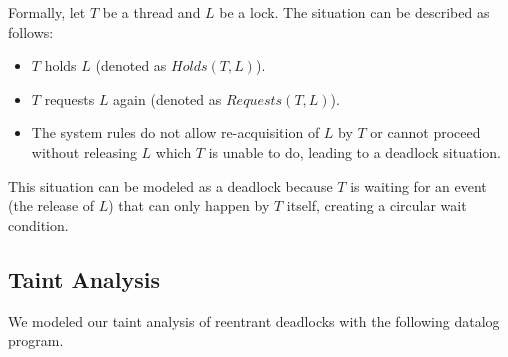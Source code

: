 \documentclass[conference]{IEEEtran}
\begin{document}
Formally, let $T$ be a thread and $L$ be a lock. The situation can be described as follows:

\begin{itemize}
    \item $T$ holds $L$ (denoted as $Holds(T, L)$).
    \item $T$ requests $L$ again (denoted as $Requests(T, L)$).
    \item The system rules do not allow re-acquisition of $L$ by $T$ or cannot proceed without releasing $L$ which $T$ is unable to do, leading to a deadlock situation.
\end{itemize}

This situation can be modeled as a deadlock because $T$ is waiting for an event (the release of $L$) that can only happen by $T$ itself, creating a circular wait condition.

\subsection{Taint Analysis}
We modeled our taint analysis of reentrant deadlocks with the following datalog program.
\end{document}
